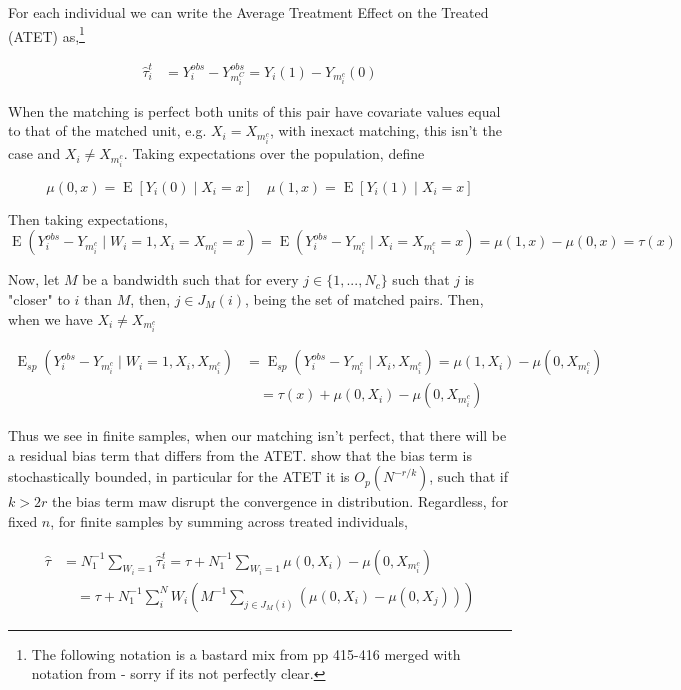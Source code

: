 \documentclass{article}
\DeclareMathOperator{\E}{E}
\begin{document}
For each individual we can write the Average Treatment Effect on the Treated (ATET) as,\footnote{The following notation is a bastard mix from \cite{InR:15} pp 415-416 merged with notation from \cite{AnI:08}- sorry if its not perfectly clear.}

\begin{align*} \hat \tau_{i}^{t} &= Y_{i}^{obs}-Y_{m_{i}^{C}}^{obs} = Y_{i}(1)-Y_{m_{i}^{c}}(0) \end{align*}

When the matching is perfect both units of this pair have covariate values equal to that of the matched unit, e.g. $X_{i} = X_{m_{i}^{c}}$, with inexact matching, this isn't the case and $X_{i} \neq X_{m_{i}^{c}}$. Taking expectations over the population, define

$$\mu(0,x) = \E[Y_{i}(0) \mid X_{i} = x]\quad \mu(1,x) = \E[Y_{i}(1) \mid X_{i} = x]$$

Then taking expectations,
$$\E(Y_{i}^{obs}-Y_{m_{i}^{c}} \mid W_{i} = 1, X_{i} = X_{m_{i}^{c}} = x) = \E(Y_{i}^{obs}-Y_{m_{i}^{c}} \mid X_{i} = X_{m_{i}^{c}} = x) = \mu(1,x) - \mu(0,x) = \tau(x)$$

Now, let $M$ be a bandwidth such that for every $j \in \{1,...,N_{c}\}$ such that $j$ is "closer" to $i$ than $M$, then, $j \in J_{M}(i)$, being the set of matched pairs. Then, when we have $X_{i} \neq X_{m_{i}^{c}}$

\begin{align*} \E_{sp}(Y_{i}^{obs}-Y_{m_{i}^{c}} \mid W_{i} = 1, X_{i}, X_{m_{i}^{c}}) &= \E_{sp}(Y_{i}^{obs}-Y_{m_{i}^{c}} \mid X_{i}, X_{m_{i}^{c}}) = \mu(1,X_{i}) - \mu(0,X_{m_{i}^{c}}) \\
&\quad= \tau(x)+ \mu(0,X_{i}) -\mu(0,X_{m_{i}^{c}}) \end{align*}

Thus we see in finite samples, when our matching isn't perfect, that there will be a residual bias term that differs from the ATET. \cite{AnI:06} show that the bias term is stochastically bounded, in particular for the ATET it is $O_{p}(N^{-r/k})$, such that if $k > 2r$ the bias term maw disrupt the convergence in distribution. Regardless, for fixed $n$, for finite samples by summing across treated individuals,

\begin{align*} \hat \tau &= N_{1}^{-1}\sum_{W_{i} = 1}\hat \tau_{i}^{t} =\tau+N_{1}^{-1}\sum_{W_{i} = 1}\mu(0,X_{i}) -\mu(0,X_{m_{i}^{c}}) \\
&\quad= \tau+N_{1}^{-1}\sum_{i}^{N}W_{i}\left(M^{-1}\sum_{j \in J_{M}(i)}(\mu(0,X_{i}) - \mu(0,X_{j}))\right)
\end{align*}
\end{document}
